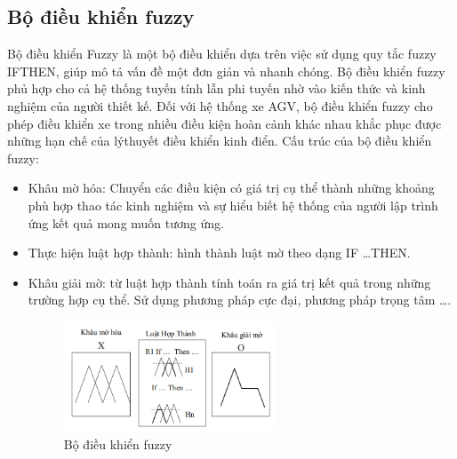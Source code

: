     \subsection{Bộ điều khiển fuzzy}
    \hspace*{0.6cm}Bộ điều khiển Fuzzy là một bộ điều khiển dựa trên việc sử dụng quy tắc fuzzy IFTHEN, giúp mô tả vấn đề một đơn giản và nhanh chóng. Bộ điều khiển fuzzy phủ hợp
    cho cả hệ thống tuyến tính lẫn phi tuyến nhờ vào kiến thức và kinh nghiệm của người
    thiết kế. Đối với hệ thống xe AGV, bộ điều khiển fuzzy cho phép điều khiển xe trong
    nhiều điều kiện hoàn cảnh khác nhau khắc phục được những hạn chế của lýthuyết điều
    khiển kinh điển.
    \newline
    \hspace*{0.6cm}Cấu trúc của bộ điều khiển fuzzy:
    \begin{itemize}[label=\textendash]
        \item Khâu mờ hóa: Chuyển các điều kiện có giá trị cụ thể thành những khoảng phù
        hợp thao tác kinh nghiệm và sự hiểu biết hệ thống của người lập trình ứng kết quả mong
        muốn tương ứng.
        \item Thực hiện luật hợp thành: hình thành luật mờ theo dạng IF \dots THEN.
        \item Khâu giải mờ: từ luật hợp thành tính toán ra giá trị kết quả trong những trường
        hợp cụ thể. Sử dụng phương pháp cực đại, phương pháp trọng tâm \dots.
        \begin{figure}[H]
            \centering
            \includegraphics[width=0.6\textwidth]{pictures/chapter1/chapter1_pic21_fuzzy.png}
            \caption{Bộ điều khiển fuzzy}
            \label{chap1_pic21}
        \end{figure}          
    \end{itemize}

